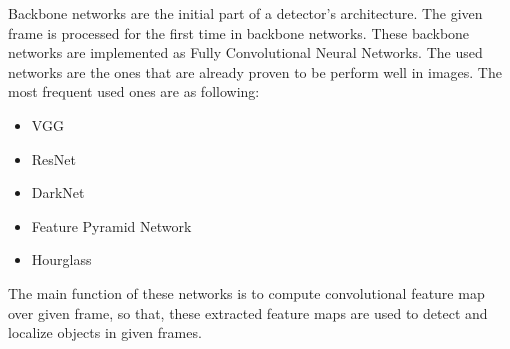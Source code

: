 \documentclass{article}
\begin{document}
\setlength{\parindent}{6ex}

\indent

Backbone networks are the initial part of a detector's architecture.
The given frame is processed for the first time in backbone networks.
These backbone networks are implemented as Fully Convolutional Neural
Networks. The used networks are the ones that are already proven to be 
perform well in images. The most frequent used ones are as following:
\begin{itemize}
    \item VGG
    \item ResNet
    \item DarkNet
    \item Feature Pyramid Network
    \item Hourglass
\end{itemize}
\indent

The main function of these networks is to compute convolutional feature map
over given frame, so that, these extracted feature maps are used to detect 
and localize objects in given frames.
\end{document}
